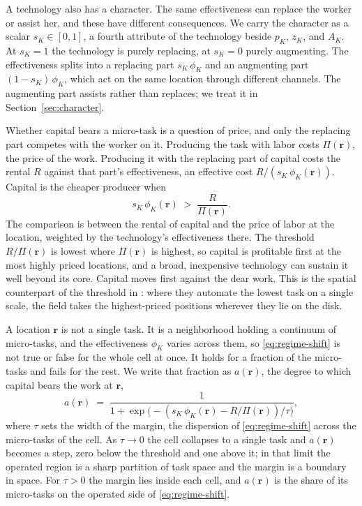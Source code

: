 \documentclass[12pt, a4paper]{article}
\begin{document}
A technology also has a character. The same effectiveness can replace
the worker or assist her, and these have different consequences. We
carry the character as a scalar $s_K \in [0,1]$, a fourth attribute of
the technology beside $p_K$, $z_K$, and $A_K$. At $s_K = 1$ the
technology is purely replacing, at $s_K = 0$ purely augmenting. The
effectiveness splits into a replacing part $s_K\,\phi_K$ and an
augmenting part $(1 - s_K)\,\phi_K$, which act on the same location
through different channels. The augmenting part assists rather than
replaces; we treat it in Section~\ref{sec:character}.

Whether capital bears a micro-task is a question of price, and only the
replacing part competes with the worker on it. Producing the task with
labor costs $\Pi(\mathbf{r})$, the price of the work. Producing it with
the replacing part of capital costs the rental $R$ against that part's
effectiveness, an effective cost $R/(s_K\,\phi_K(\mathbf{r}))$. Capital
is the cheaper producer when
\begin{equation}
  s_K\,\phi_K(\mathbf{r}) \;>\; \frac{R}{\Pi(\mathbf{r})}.
  \label{eq:regime-shift}
\end{equation}
The comparison is between the rental of capital and the price of labor
at the location, weighted by the technology's effectiveness there. The
threshold $R/\Pi(\mathbf{r})$ is lowest where $\Pi(\mathbf{r})$ is
highest, so capital is profitable first at the most highly priced
locations, and a broad, inexpensive technology can sustain it well
beyond its core. Capital moves first against the dear work. This is the
spatial counterpart of the threshold in \textcite{acemoglu2018race}:
where they automate the lowest task on a single scale, the field takes
the highest-priced positions wherever they lie on the disk.

A location $\mathbf{r}$ is not a single task. It is a neighborhood
holding a continuum of micro-tasks, and the effectiveness $\phi_K$
varies across them, so \eqref{eq:regime-shift} is not true or false for
the whole cell at once. It holds for a fraction of the micro-tasks and
fails for the rest. We write that fraction as $a(\mathbf{r})$, the
degree to which capital bears the work at $\mathbf{r}$,
\begin{equation}
  a(\mathbf{r})
  \;=\;
  \frac{1}{1 + \exp\!\bigl(-(s_K\,\phi_K(\mathbf{r}) - R/\Pi(\mathbf{r}))/\tau\bigr)},
  \label{eq:soft-switch}
\end{equation}
where $\tau$ sets the width of the margin, the dispersion of
\eqref{eq:regime-shift} across the micro-tasks of the cell. As
$\tau \to 0$ the cell collapses to a single task and $a(\mathbf{r})$
becomes a step, zero below the threshold and one above it; in that
limit the operated region is a sharp partition of task space and the
margin is a boundary in space. For $\tau > 0$ the margin lies inside
each cell, and $a(\mathbf{r})$ is the share of its micro-tasks on the
operated side of \eqref{eq:regime-shift}.
\end{document}
